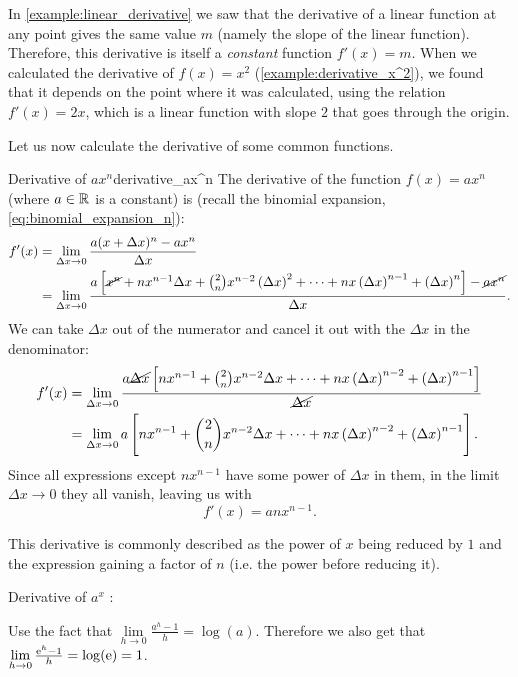 In \autoref{example:linear_derivative} we saw that the derivative of a linear function at any point gives the same value $m$ (namely the slope of the linear function). Therefore, this derivative is itself a \textit{constant} function $f'(x)=m$. When we calculated the derivative of $f(x)=x^{2}$ (\autoref{example:derivative_x^2}), we found that it depends on the point where it was calculated, using the relation $f'(x)=2x$, which is a linear function with slope $2$ that goes through the origin.

Let us now calculate the derivative of some common functions.
\begin{example}{Derivative of $ax^{n}$}{derivative_ax^n}
  The derivative of the function $f(x)=ax^{n}$ (where $a\in\mathbb{R}^{}$ is a constant) is (recall the binomial expansion, \autoref{eq:binomial_expansion_n}):
  \begin{align*}
    f'(x) &= \lim\limits_{\Delta x\to 0}\frac{a(x+\Delta x)^{n}-ax^{n}}{\Delta x}\\
          &= \lim\limits_{\Delta x\to 0}\frac{a\left[\cancel{x^{n}} + nx^{n-1}\Delta x + \binom{2}{n}x^{n-2}\left(\Delta x\right)^{2} + \dots + nx\left(\Delta x\right)^{n-1} + \left(\Delta x\right)^{n}\right]-\cancel{ax^{n}}}{\Delta x}.
  \end{align*}
  We can take $\Delta x$ out of the numerator and cancel it out with the $\Delta x$ in the denominator:
  \begin{align*}
    f'(x) &= \lim\limits_{\Delta x\to 0}\frac{a\cancel{\Delta x}\left[ nx^{n-1} + \binom{2}{n}x^{n-2}\Delta x + \dots + nx\left(\Delta x\right)^{n-2} + \left(\Delta x\right)^{n-1} \right]}{\cancel{\Delta x}}\\
          &= \lim\limits_{\Delta x\to 0}a\left[ nx^{n-1} + \binom{2}{n}x^{n-2}\Delta x + \dots + nx\left(\Delta x\right)^{n-2} + \left(\Delta x\right)^{n-1} \right].
  \end{align*}
  Since all expressions except $nx^{n-1}$ have some power of $\Delta x$ in them, in the limit $\Delta x\to 0$ they all vanish, leaving us with
  \[
    f'(x) = anx^{n-1}.
  \]

  This derivative is commonly described as the power of $x$ being reduced by $1$ and the expression gaining a factor of $n$ (i.e. the power before reducing it).
\end{example}

\begin{example}{Derivative of $a^{x}$}{}
  :

  Use the fact that $\lim\limits_{h\to 0}\frac{a^{h}-1}{h}=\log(a)$. Therefore we also get that $\lim\limits_{h\to 0}\frac{\mathrm{e}^{h}-1}{h}=\log(\mathrm{e})=1$.
\end{example}

